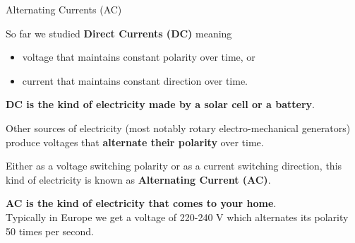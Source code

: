 \begin{frame}{Alternating Currents (AC)}

So far we studied {\bf Direct Currents (DC)} meaning
\begin{itemize}
  \item voltage that maintains constant polarity over time, or
  \item current that maintains constant direction over time.
\end{itemize}

\vspace{0.4cm}

{\bf DC is the kind of electricity made by a solar cell or a battery}.\\

\vspace{0.2cm}

Other sources of electricity (most notably rotary electro-mechanical generators)
produce voltages that {\bf alternate their polarity} over time.\\

\vspace{0.4cm}

Either as a voltage switching polarity or as a current switching direction,
this kind of electricity is known as {\bf Alternating Current (AC)}.\\

\vspace{0.4cm}

{\bf AC is the kind of electricity that comes to your home}. \\
Typically in Europe we get a voltage of 220-240 V which alternates its polarity 50 times per second.

\end{frame}

%
%
%

